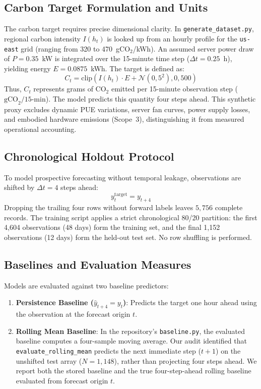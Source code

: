 \documentclass[conference]{IEEEtran}
\begin{document}
\subsection{Carbon Target Formulation and Units}
The carbon target requires precise dimensional clarity. In \texttt{generate\_dataset.py}, regional carbon intensity $I(h_t)$ is looked up from an hourly profile for the \texttt{us-east} grid (ranging from 320 to 470~gCO$_2$/kWh). An assumed server power draw of $P = 0.35$~kW is integrated over the 15-minute time step ($\Delta t = 0.25$~h), yielding energy $E = 0.0875$~kWh. The target is defined as:
\begin{equation}
    C_t = \text{clip}\left(I(h_t) \cdot E + \mathcal{N}(0, 5^2), 0, 500\right)
\end{equation}
Thus, $C_t$ represents grams of CO$_2$ emitted per 15-minute observation step ($\text{gCO}_2/\text{15-min}$). The model predicts this quantity four steps ahead. This synthetic proxy excludes dynamic PUE variations, server fan curves, power supply losses, and embodied hardware emissions (Scope~3), distinguishing it from measured operational accounting.

\subsection{Chronological Holdout Protocol}
To model prospective forecasting without temporal leakage, observations are shifted by $\Delta t = 4$ steps ahead:
\begin{equation}
    y_t^{\text{target}} = y_{t+4}
\end{equation}
Dropping the trailing four rows without forward labels leaves $5{,}756$ complete records. The training script applies a strict chronological 80/20 partition: the first 4,604 observations (48 days) form the training set, and the final 1,152 observations (12 days) form the held-out test set. No row shuffling is performed.

\subsection{Baselines and Evaluation Measures}
Models are evaluated against two baseline predictors:
\begin{enumerate}
    \item \textbf{Persistence Baseline ($\hat{y}_{t+4} = y_t$)}: Predicts the target one hour ahead using the observation at the forecast origin $t$.
    \item \textbf{Rolling Mean Baseline}: In the repository's \texttt{baseline.py}, the evaluated baseline computes a four-sample moving average. Our audit identified that \texttt{evaluate\_rolling\_mean} predicts the next immediate step ($t+1$) on the unshifted test array ($N=1{,}148$), rather than projecting four steps ahead. We report both the stored baseline and the true four-step-ahead rolling baseline evaluated from forecast origin $t$.
\end{enumerate}
\end{document}
